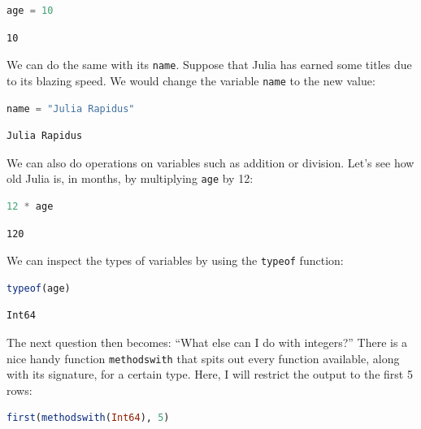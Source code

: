 \documentclass[
  notoc %
]{tufte-book}
\newcommand{\passthrough}[1]{#1}
\begin{document}
\begin{lstlisting}[language=Julia]
age = 10
\end{lstlisting}

\begin{lstlisting}[language=Output]
10
\end{lstlisting}

We can do the same with its \passthrough{\lstinline!name!}. Suppose that
Julia has earned some titles due to its blazing speed. We would change
the variable \passthrough{\lstinline!name!} to the new value:

\begin{lstlisting}[language=Julia]
name = "Julia Rapidus"
\end{lstlisting}

\begin{lstlisting}[language=Output]
Julia Rapidus
\end{lstlisting}

We can also do operations on variables such as addition or division.
Let's see how old Julia is, in months, by multiplying
\passthrough{\lstinline!age!} by 12:

\begin{lstlisting}[language=Julia]
12 * age
\end{lstlisting}

\begin{lstlisting}[language=Output]
120
\end{lstlisting}

We can inspect the types of variables by using the
\passthrough{\lstinline!typeof!} function:

\begin{lstlisting}[language=Julia]
typeof(age)
\end{lstlisting}

\begin{lstlisting}[language=Output]
Int64
\end{lstlisting}

The next question then becomes: ``What else can I do with integers?''
There is a nice handy function \passthrough{\lstinline!methodswith!}
that spits out every function available, along with its signature, for a
certain type. Here, I will restrict the output to the first 5 rows:

\begin{lstlisting}[language=Julia]
first(methodswith(Int64), 5)
\end{lstlisting}
\end{document}
